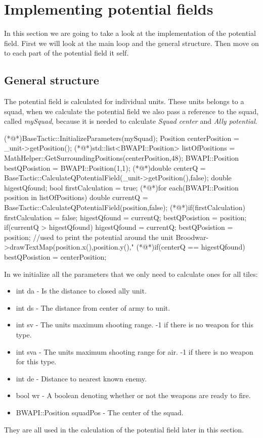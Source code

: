 \section{Implementing potential fields}
	In this section we are going to take a look at the implementation of the potential field. First we will look at the main loop and the general structure. Then move on to each part of the potential field it self.
	
	\subsection{General structure}
	The potential field is calculated for individual units. These units belongs to a squad, when we calculate the potential field we also pass a reference to the squad, called \textit{mySquad}, because it is needed to calculate \textit{Squad center} and \textit{Ally potential}.

\begin{Sourcecode}[caption=Main loop]	
(*@\lnote@*)BaseTactic::InitializeParameters(mySquad);
Position centerPosition = _unit->getPosition();
(*@\lnote@*)std::list<BWAPI::Position> listOfPositions = MathHelper::GetSurroundingPositions(centerPosition,48);
BWAPI::Position bestQPosistion = BWAPI::Position(1,1);
(*@\lnote@*)double centerQ = BaseTactic::CalculateQPotentialField(_unit->getPosition(),false);
double higestQfound; 
bool firstCalculation = true;
(*@\lnote@*)for each(BWAPI::Position position in listOfPositions)
{
	double currentQ = BaseTactic::CalculateQPotentialField(position,false);
	(*@\lnote@*)if(firstCalculation)
	{
		firstCalculation = false;
		higestQfound = currentQ;
		bestQPosistion = position;
	} 
	if(currentQ > higestQfound)
	{
		higestQfound = currentQ;
		bestQPosistion = position;
	}
	//used to print the potential around the unit
	Broodwar->drawTextMap(position.x(),position.y(),"%
}
(*@\lnote@*)if(centerQ == higestQfound)
{
	bestQPosistion = centerPosition;
}
\end{Sourcecode}	
	In  we initialize all the parameters that we only need to calculate ones for all tiles:
	\begin{itemize}
	    \item int da - Is the distance to closed ally unit.
		\item int ds - The distance from center of army to unit.
		\item int sv - The units maximum shooting range. -1 if there is no weapon for this type.
		\item int sva - The units maximum shooting range for air. -1 if there is no weapon for this type.
		\item int de - Distance to nearest known enemy.
		\item bool wr - A boolean denoting whether or not the weapons are ready to fire.
		\item BWAPI::Position squadPos - The center of the squad.
	\end{itemize}
	They are all used in the calculation of the potential field later in this section.	
	
